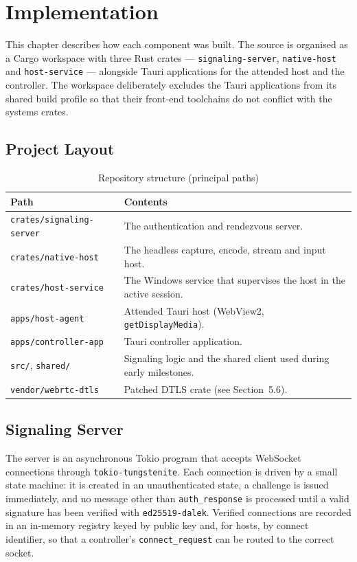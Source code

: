 \chapter{Implementation}

This chapter describes how each component was built. The source is organised as a
Cargo workspace with three Rust crates --- \texttt{signaling-server},
\texttt{native-host} and \texttt{host-service} --- alongside Tauri applications
for the attended host and the controller. The workspace deliberately excludes the
Tauri applications from its shared build profile so that their front-end
toolchains do not conflict with the systems crates.

\section{Project Layout}

\begin{table}[H]
\centering
\caption{Repository structure (principal paths)}
\label{tab:layout}
\small
\begin{tabular}{@{}p{5cm}p{8.4cm}@{}}
\toprule
\textbf{Path} & \textbf{Contents} \\
\midrule
\texttt{crates/signaling-server} & The authentication and rendezvous server. \\
\texttt{crates/native-host}      & The headless capture, encode, stream and input host. \\
\texttt{crates/host-service}     & The Windows service that supervises the host in the active session. \\
\texttt{apps/host-agent}         & Attended Tauri host (WebView2, \texttt{getDisplayMedia}). \\
\texttt{apps/controller-app}     & Tauri controller application. \\
\texttt{src/}, \texttt{shared/}  & Signaling logic and the shared client used during early milestones. \\
\texttt{vendor/webrtc-dtls}      & Patched DTLS crate (see Section~5.6). \\
\bottomrule
\end{tabular}
\end{table}

\section{Signaling Server}

The server is an asynchronous Tokio program that accepts WebSocket connections
through \texttt{tokio-tungstenite}. Each connection is driven by a small state
machine: it is created in an unauthenticated state, a challenge is issued
immediately, and no message other than \texttt{auth\_response} is processed until
a valid signature has been verified with \texttt{ed25519-dalek}. Verified
connections are recorded in an in-memory registry keyed by public key and, for
hosts, by connect identifier, so that a controller's \texttt{connect\_request}
can be routed to the correct socket.

